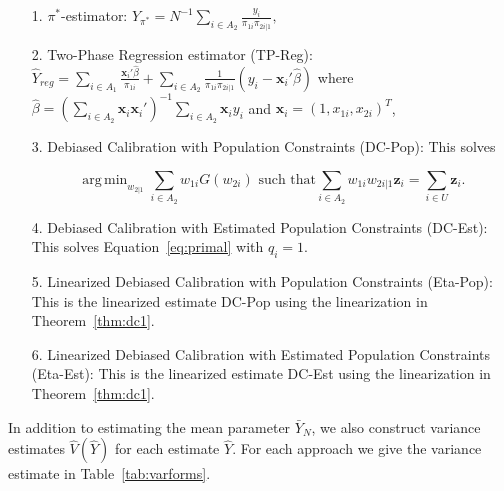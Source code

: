 \documentclass[12pt]{article}
\DeclareMathOperator*{\argmin}{arg\,min}
\renewcommand{\bf}[1]{\mathbf{#1}}
\begin{document}
\begin{itemize}
  \item[1.] $\pi^*$-estimator: $\hat Y_{\pi^*} = N^{-1} \sum_{i \in A_2}
    \frac{y_i}{\pi_{1i} \pi_{2i|1}},$
  \item[2.] Two-Phase Regression estimator (TP-Reg): 
    $\hat Y_{reg} = \sum_{i \in A_1} \frac{\bf x_i' \hat \beta}{\pi_{1i}} + 
    \sum_{i \in A_2} \frac{1}{\pi_{1i}\pi_{2i|1}}(y_i - \bf x_i' \hat \beta)$ 
    where $\hat \beta = 
    \left(\sum_{i \in A_2} \bf x_i \bf x_i'\right)^{-1} \sum_{i \in A_2} \bf x_i y_i$
    and $\bf x_i = (1, x_{1i}, x_{2i})^T$,

  \item[3.] Debiased Calibration with Population Constraints (DC-Pop): This 
    solves 

  \begin{equation}
    \argmin_{w_{2|1}} \sum_{i \in A_2} w_{1i} G(w_{2i}) \text{ such that}
    \sum_{i \in A_2} w_{1i} w_{2i|1} \bf z_i = \sum_{i \in U} \bf z_i.
  \end{equation}

  \item[4.] Debiased Calibration with Estimated Population Constraints (DC-Est):
    This solves Equation~\eqref{eq:primal} with $q_i = 1$.
  \item[5.] Linearized Debiased Calibration with Population Constraints (Eta-Pop):
    This is the linearized estimate DC-Pop using the linearization in
    Theorem~\ref{thm:dc1}.
  \item[6.] Linearized Debiased Calibration with Estimated Population
    Constraints (Eta-Est): This is the linearized estimate DC-Est using the
    linearization in Theorem~\ref{thm:dc1}.
\end{itemize}

In addition to estimating the mean parameter $\bar Y_N$, we also construct
variance estimates $\hat V(\hat Y)$ for each estimate $\hat Y$. For each
approach we give the variance estimate in Table~\ref{tab:varforms}.
\end{document}
